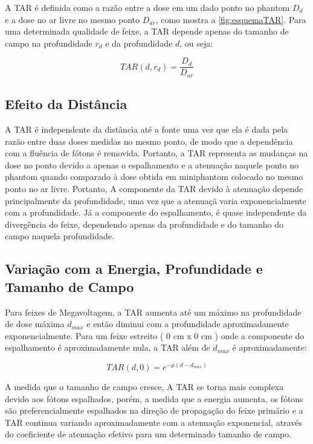 \documentclass[11pt,a4paper]{article}
\begin{document}
	A TAR é definida como a razão entre a dose em um dado ponto no phantom $D_d$ e a dose no ar livre no mesmo ponto $D_{ar}$, como mostra a \ref{fig:esquemaTAR}. Para uma determinada qualidade de feixe, a TAR depende apenas do tamanho de campo na profundidade $r_d$ e da profundidade $d$, ou seja:

		\begin{equation}
			TAR(d, r_d) = \frac{D_d}{D_{ar}}
		\end{equation}


	\subsection{Efeito da Distância}

	A TAR é independente da distância até a fonte uma vez que ela é dada pela razão entre duas doses medidas no mesmo ponto, de modo que a dependência com a fluência de fótons é removida. Portanto, a TAR representa as mudanças na dose no ponto devido a apenas o espalhamento e a atenuação naquele ponto no phantom quando comparado à dose obtida em  miniphantom colocado no mesmo ponto no ar livre. Portanto, A componente da TAR devido à atenuação depende principalmente da profundidade, uma vez que a atenuaçã varia exponencialmente com a profundidade. Já a componente do espalhamento, é quase independente da divergência do feixe, dependendo apenas da profundidade e do tamanho do campo naquela profundidade.

	\subsection{Variação com a Energia, Profundidade e Tamanho de Campo}

	Para feixes de Megavoltagem, a TAR aumenta até um máximo na profundidade de dose máxima $d_{max}$ e então diminui com a profundidade aproximadamente exponencialmente. Para um feixe estreito ( 0 cm x 0 cm ) onde a componente do espalhamento é aproximadamente nula, a TAR além de $d_{max}$ é aproximadamente:
	
		\begin{equation}
			TAR(d, 0) = e^{-\bar{\mu} (d - d_{max})}
		\end{equation}

	A medida que o tamanho de campo cresce, A TAR se torna mais complexa devido aos fótons espalhados, porém, a medida que a energia aumenta, os fótons são preferencialmente espalhados na direção de propagação do feixe primário e a TAR continua variando aproximadamente com a atenuação exponencial, através do coeficiente de atenuação efetivo para um determinado tamanho de campo.
\end{document}
